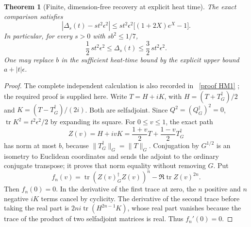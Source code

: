 \documentclass[11pt]{article}
\newcommand{\tr}{\operatorname{tr}}\newcommand{\dd}{\dagger_G}
\newcommand{\eps}{\epsilon}\newcommand{\spec}{\operatorname{spec}}
\newtheorem{theorem}{Theorem}[section]
\begin{document}
\begin{theorem}[Finite, dimension-free recovery at explicit heat time]
The exact comparison satisfies
\begin{equation}\tag{NH33}\label{NH33}
\left|\Delta_s(t)-st^2\eps^2\right|
\le st^2\eps^2\bigl[(1+2X)e^X-1\bigr].
\end{equation}
In particular, for every \(s>0\) with \(sb^2\le1/7\),
\begin{equation}\tag{NH34}\label{NH34}
\frac12\,st^2\eps^2\le\Delta_s(t)
\le\frac32\,st^2\eps^2 .
\end{equation}
One may replace \(b\) in the sufficient heat-time bound
by the explicit upper bound \(a+|t|\eps\).
\end{theorem}
\begin{proof}
The complete independent calculation is also recorded
in \cite{MetricHeat}%
~\href{https://github.com/KokunoYumeto/zeta-function-research-reader/blob/5992ad50c0f2a06921f1fcaded7b4e38097c0739/workbenches/splitzero-tandem/continuations/20260920-original-kernel-mixed-determinants/providers/HEAT_METRIC_COMPARISON.tex\#L43}{[proof HM1]}%
{}; the required proof is supplied here.
Write \(T=H+iK\), with
\(H=(T+T^\dd)/2\) and \(K=(T-T^\dd)/(2i)\).
Both are selfadjoint. Since \(Q^2=(Q^\dd)^2=0\),
\(\tr K^2=t^2\eps^2/2\) by expanding its square.
For \(0\le v\le1\), the exact path
\[
Z(v)=H+ivK=\frac{1+v}{2}T+\frac{1-v}{2}T^\dd
\]
has norm at most \(b\), because \(\|T^\dd\|_G=\|T\|_G\).
Conjugation by \(G^{1/2}\) is an isometry to Euclidean
coordinates and sends the adjoint to the ordinary
conjugate transpose; it proves that norm equality
without removing \(G\).
Put
\[
f_n(v)=\tr(Z(v)^\dd Z(v))^n-\Re\tr Z(v)^{2n}.
\]
Then \(f_n(0)=0\). In the derivative of the first
trace at zero, the \(n\) positive and \(n\) negative
\(iK\) terms cancel by cyclicity. The derivative of the
second trace before taking the real part is
\(2ni\tr(H^{2n-1}K)\), whose real part vanishes because
the trace of the product of two selfadjoint matrices
is real. Thus \(f_n'(0)=0\).


\end{proof}
\end{document}

